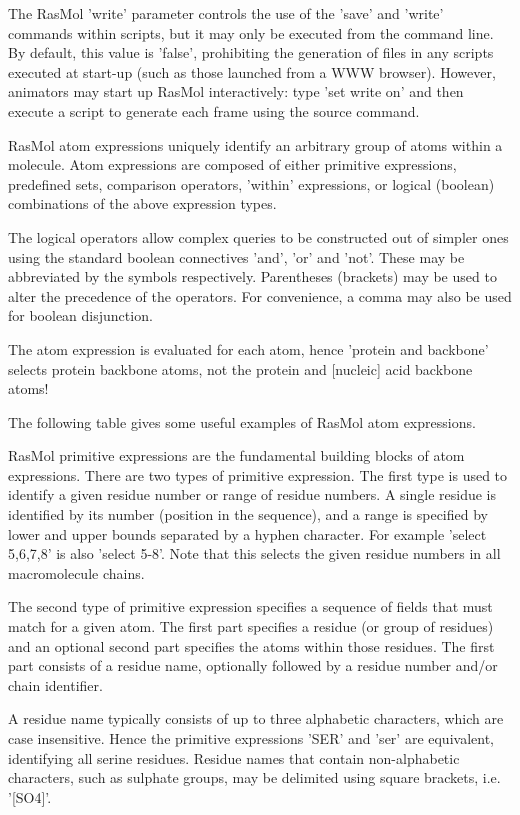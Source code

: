 The RasMol
'write'
parameter controls the use of the
'save'
and
'write'
commands within scripts, but it may only be executed from the
command line.  By default, this value is
'false',
prohibiting the generation of files in any scripts executed at
start-up (such as those launched from a WWW browser). However,
animators may start up RasMol interactively: type
'set write on'
and then execute a script to generate each frame using the
source command.

RasMol atom expressions uniquely identify an arbitrary group of atoms
within a molecule. Atom expressions are composed of either primitive
expressions,
predefined sets,
comparison operators,
'within'
expressions,
or logical (boolean) combinations of the above expression types.

The logical operators allow complex queries to be constructed out of
simpler ones using the standard boolean connectives
'and',
'or'
and
'not'.
These may be abbreviated by the symbols
respectively. Parentheses (brackets) may be used to alter the
precedence of the operators. For convenience, a comma may also
be used for boolean disjunction.

The atom expression is evaluated for each atom, hence
'protein and backbone'
selects protein backbone atoms, not the protein and [nucleic] acid
backbone atoms!

The following table gives some useful examples of RasMol
atom expressions.

RasMol primitive expressions are the fundamental building blocks
of atom expressions. There are two types of primitive expression.
The first type is used to identify a given residue number or range
of residue numbers. A single residue is identified by its number
(position in the sequence), and a range is specified by lower and
upper bounds separated by a hyphen character. For example
'select 5,6,7,8'
is also
'select 5-8'.
Note that this selects the given residue numbers in all macromolecule
chains.

The second type of primitive expression specifies a sequence of fields
that must match for a given atom. The first part specifies a residue
(or group of residues) and an optional second part specifies the atoms
within those residues. The first part consists of a residue name,
optionally followed by a residue number and/or chain identifier.

A residue name typically consists of up to three alphabetic characters,
which are case insensitive. Hence the primitive expressions
'SER'
and
'ser'
are equivalent, identifying all serine residues.
Residue names that contain non-alphabetic characters, such as
sulphate groups, may be delimited using square brackets, i.e.
'[SO4]'.

